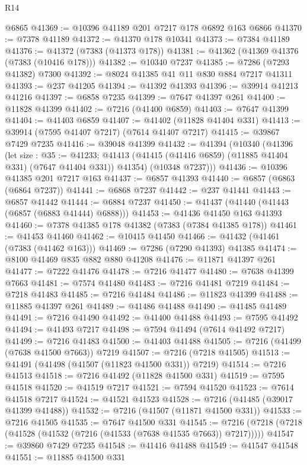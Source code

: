 \begin{lexlean}{R14}
\begin{coremodule}
    @6865
@41369 := @10396 @41189 @201 @7217 @178 @6892 @163 @6866
@41370 := @7378 @41189
@41372 := @41370 @178 @10341
@41373 := @7384 @41189
@41376 := @41372 (@7383 (@41373 @178))
@41381 := @41362 (@41369 @41376 (@7383 (@10416 @178)))
@41382 := @10340 @7237
@41385 := @7286 (@7293 @41382) @7300
@41392 := @8024 @41385 @41 @11 @830 @884 @7217 @41311
@41393 := @237 @41205
@41394 := @41392 @41393
@41396 := @39914 @41213 @41216
@41397 := @6858 @7235
@41399 := @7647 @41397 @261
@41400 := @11828 @41399
@41402 := @7216 (@41400 @6859)
@41403 := @7647 @41399
@41404 := @41403 @6859
@41407 := @41402 (@11828 @41404 @331)
@41413 := @39914 (@7595 @41407 @7217) (@7614 @41407 @7217)
@41415 := @39867 @7429 @7235
@41416 := @39048 @41399
@41432 := @41394
    (@10340
      (@41396
        (let size : @35 := @41233;
        @41413 (@41415 (@41416 @6859) (@11885 @41404 @331) (@7647 @41404 @331)) @41354)
        (@10348 @7237)))
@41436 := @10396 @41385 @201 @7217 @163
@41437 := @6857 @41393
@41440 := @6857 (@6863 (@6864 @7237))
@41441 := @6868 @7237
@41442 := @237 @41441
@41443 := @6857 @41442
@41444 := @6884 @7237
@41450 := @41437 (@41440 (@41443 (@6857 (@6883 @41444) @6888)))
@41453 := @41436 @41450 @163 @41393
@41460 := @7378 @41385 @178 @41382 (@7383 (@7384 @41385 @178))
@41461 := @41453 @41460
@41462 := @10415 @41450
@41466 := @41432 (@41461 (@7383 (@41462 @163)))
@41469 := @7286 (@7290 @41393) @41385
@41474 := @8100 @41469 @835 @882 @880 @41208
@41476 := @11871 @41397 @261
@41477 := @7222 @41476
@41478 := @7216 @41477
@41480 := @7638 @41399 @7663
@41481 := @7574 @41480
@41483 := @7216 @41481 @7219
@41484 := @7218 @41483
@41485 := @7216 @41484
@41486 := @11823 @41399
@41488 := @11885 @41397 @261
@41489 := @41486 @41488
@41490 := @41485 @41489
@41491 := @7216 @41490
@41492 := @41400 @41488
@41493 := @7595 @41492
@41494 := @41493 @7217
@41498 := @7594 @41494 (@7614 @41492 @7217)
@41499 := @7216 @41483
@41500 := @41403 @41488
@41505 := @7216 (@41499 (@7638 @41500 @7663)) @7219
@41507 := @7216 (@7218 @41505)
@41513 := @41491 (@41498 (@41507 (@11823 @41500 @331)) @7219)
@41514 := @7216 @41513
@41518 := @7216 @41492 (@11828 @41500 @331)
@41519 := @7595 @41518
@41520 := @41519 @7217
@41521 := @7594 @41520
@41523 := @7614 @41518 @7217
@41524 := @41521 @41523
@41528 := @7216 (@41485 (@39017 @41399 @41488))
@41532 := @7216 (@41507 (@11871 @41500 @331))
@41533 := @7216 @41505
@41535 := @7647 @41500 @331
@41545 := @7216 (@7218 (@7218 (@41528 (@41532 (@7216 (@41533 (@7638 @41535 @7663)) @7217)))))
@41547 := @39860 @7429 @7235
@41548 := @41416 @41488
@41549 := @41547 @41548
@41551 := @11885 @41500 @331

\end{coremodule}
\end{lexlean}
